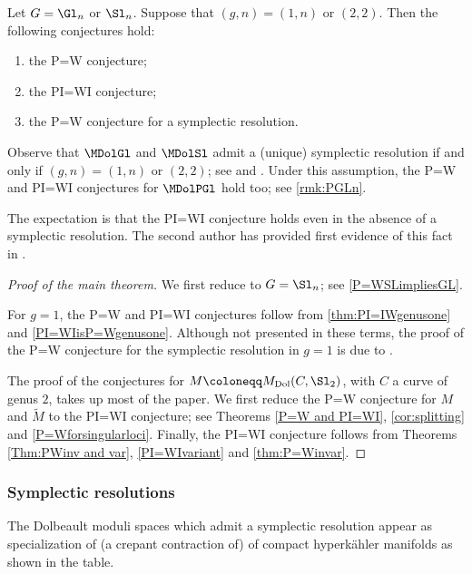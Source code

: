 \begin{mainthm}
Let $G=\Gl_n$ or $\Sl_n$. Suppose that $(g,n)=(1,n)$ or $(2,2)$. Then the following conjectures hold:
\begin{enumerate}
\item the P=W conjecture;
\item the PI=WI conjecture;
\item the P=W conjecture for a symplectic resolution.
\end{enumerate}
\end{mainthm}
Observe that $\MDolGl$ and $\MDolSl$ admit a (unique) symplectic resolution if and only if $(g,n)=(1,n)$ or $(2,2)$; see \cite{BellamySchedler2019} and \cite[Th.\,2.2]{FuNamikawa04}. Under this assumption, the P=W and PI=WI conjectures for $\MDolPGl$ hold too; see \hbox{\cref{rmk:PGLn}}.

The expectation is that the PI=WI conjecture holds even in the absence of a symplectic resolution. The second author has provided first evidence of this fact in \cite[\S 5]{Mauri2021}.
\begin{proof}[Proof of the main theorem]
We first reduce to $G=\Sl_n$; see \cref{P=WSLimpliesGL}.

For $g=1$, the P=W and PI=WI conjectures follow from \cref{thm:PI=IWgenusone} and
\hbox{\cref{PI=WIisP=Wgenusone}}.
Although not presented in these terms, the proof of the P=W conjecture for the symplectic resolution in $g=1$ is due to \cite{deCataldoHauselMigliorini2013}.

The proof of the conjectures for $M \coloneqq M_{\mathrm{Dol}}(C, \Sl_2)$, with $C$ a curve of genus $2$, takes up most of the paper. We first reduce the P=W conjecture for $M$ and $\widetilde{M}$ to the PI=WI conjecture; see Theorems \ref{P=W and PI=WI}, \ref{cor:splitting} and \ref{P=Wforsingularloci}. Finally, the PI=WI conjecture follows from Theorems \ref{Thm:PWinv and var}, \ref{PI=WIvariant} and \ref{thm:P=Winvar}.
\end{proof}

\subsubsection*{Symplectic resolutions}
The Dolbeault moduli spaces which admit a symplectic resolution appear as specialization of (a crepant contraction of) of compact hyperkähler manifolds as shown in the table.

